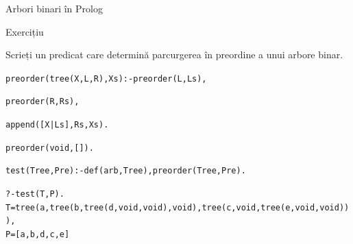\documentclass[xcolor=x11names,compress,10pt]{beamer}
\begin{document}
%
%
%
%
%
%
%


\begin{frame}{Arbori binari în Prolog}
\begin{block}{Exercițiu}

Scrieți un predicat  care determină parcurgerea în preordine a unui arbore binar. 
\bigskip


\begin{alltt}

preorder(tree(X,L,R),Xs) :-	 preorder(L,Ls),

\hspace*{5cm} preorder(R,Rs), 

\hspace*{5cm}		append([X|Ls],Rs,Xs).\pause

preorder(void,[]).

\pause

test(Tree,Pre):- def(arb, Tree), preorder(Tree,Pre).
\medskip
\pause 

?- test(T,P).\\
T = tree(a, tree(b, tree(d, void, void), void), tree(c, void, tree(e, void, void))),\\
P = [a, b, d, c, e]
\end{alltt}
\end{block}


\end{frame}

\end{document}
